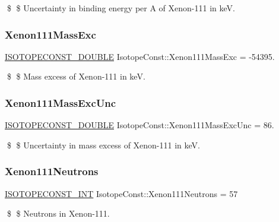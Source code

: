 \$ \$ Uncertainty in binding energy per A of Xenon-\/111 in keV. \mbox{\label{group___isotope_const-_xenon-_xe111_ga728dec9de081b28ceae5b1cc9a08df99}} 
\subsubsection{\texorpdfstring{Xenon111\+Mass\+Exc}{Xenon111MassExc}}
{\footnotesize\ttfamily \mbox{\hyperlink{group___isotope_const-_macros_ga8f45a7272ce02c0b4c65c44636ed719a}{I\+S\+O\+T\+O\+P\+E\+C\+O\+N\+S\+T\+\_\+\+D\+O\+U\+B\+LE}} Isotope\+Const\+::\+Xenon111\+Mass\+Exc = -\/54395.}

\$ \$ Mass excess of Xenon-\/111 in keV. \mbox{\label{group___isotope_const-_xenon-_xe111_gabca3c12a789904324da2cb4fa29866bd}} 
\subsubsection{\texorpdfstring{Xenon111\+Mass\+Exc\+Unc}{Xenon111MassExcUnc}}
{\footnotesize\ttfamily \mbox{\hyperlink{group___isotope_const-_macros_ga8f45a7272ce02c0b4c65c44636ed719a}{I\+S\+O\+T\+O\+P\+E\+C\+O\+N\+S\+T\+\_\+\+D\+O\+U\+B\+LE}} Isotope\+Const\+::\+Xenon111\+Mass\+Exc\+Unc = 86.}

\$ \$ Uncertainty in mass excess of Xenon-\/111 in keV. \mbox{\label{group___isotope_const-_xenon-_xe111_gae80cf55ab8f6b690464ae2d7d14457c1}} 
\subsubsection{\texorpdfstring{Xenon111\+Neutrons}{Xenon111Neutrons}}
{\footnotesize\ttfamily \mbox{\hyperlink{group___isotope_const-_macros_ga5f18360b3e99483a35c32d789e62621c}{I\+S\+O\+T\+O\+P\+E\+C\+O\+N\+S\+T\+\_\+\+I\+NT}} Isotope\+Const\+::\+Xenon111\+Neutrons = 57}

\$ \$ Neutrons in Xenon-\/111. \mbox{\label{group___isotope_const-_xenon-_xe111_ga42d98054be032393ed3f44888e229f4e}} 
